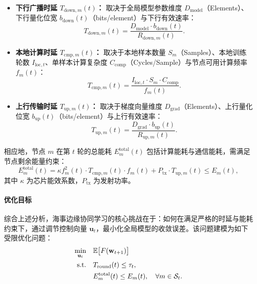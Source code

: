 \begin{itemize}
	\item \textbf{下行广播时延 $T_{\text{down},m}(t)$：} 取决于全局模型参数维度 $D_{\text{model}}$（Elements）、下行量化位宽 $b_{\text{down}}(t)$（bits/element）与下行有效速率：
	\begin{equation} T_{\text{down},m}(t) = \frac{D_{\text{model}} \cdot b_{\text{down}}(t)}{R_{\text{down},m}(t)}. 
	\end{equation}
	
	\item \textbf{本地计算时延 $T_{\text{cmp},m}(t)$：} 取决于本地样本数量 $S_m$（Samples）、本地训练轮数 $I_{\text{loc},t}$、单样本计算复杂度 $C_{\text{comp}}$（Cycles/Sample）与节点可用计算频率 $f_m(t)$：
	\begin{equation} 
		T_{\text{cmp},m}(t) = \frac{I_{\text{loc},t} \cdot S_m \cdot C_{\text{comp}}}{f_m(t)}. 
	\end{equation}
	
	\item \textbf{上行传输时延 $T_{\text{up},m}(t)$：} 取决于梯度向量维度 $D_{\text{grad}}$（Elements）、上行量化位宽 $b_{\text{up}}(t)$（bits/element）与上行有效速率：
	\begin{equation} 
		T_{\text{up},m}(t) = \frac{D_{\text{grad}} \cdot b_{\text{up}}(t)}{R_{\text{up},m}(t)}. 
	\end{equation}
\end{itemize}

相应地，节点 $m$ 在第 $t$ 轮的总能耗 $E^{\text{total}}_m(t)$ 包括计算能耗与通信能耗，需满足节点剩余能量约束：
\begin{equation}
	E^{\text{total}}_m(t) = \kappa f_m^2(t) \cdot T_{\text{cmp},m}(t) \cdot f_m(t) + P_{\text{tx}} \cdot T_{\text{up},m}(t) \le E_m(t),
	\label{eq:energy_constraint}
\end{equation}
其中 $\kappa$ 为芯片能效系数，$P_{\text{tx}}$ 为发射功率。

\paragraph{优化目标}
综合上述分析，海事边缘协同学习的核心挑战在于：如何在满足严格的时延与能耗约束下，通过调节控制向量 $\mathbf{u}_t$，最小化全局模型的收敛误差。该问题建模为如下受限优化问题：
\begin{align}
	\min_{\mathbf{u}_t} \quad & \mathbb{E}\big[F(\mathbf{w}_{t+1})\big] \label{eq:optimiza_target_fed} \\
	\text{s.t.} \quad 
	& T_{\text{round}}(t) \le \tau_t, \notag \\
	& E^{\text{total}}_m(t) \le E_m(t), \quad \forall m \in \mathcal{S}_t. \notag
\end{align}

